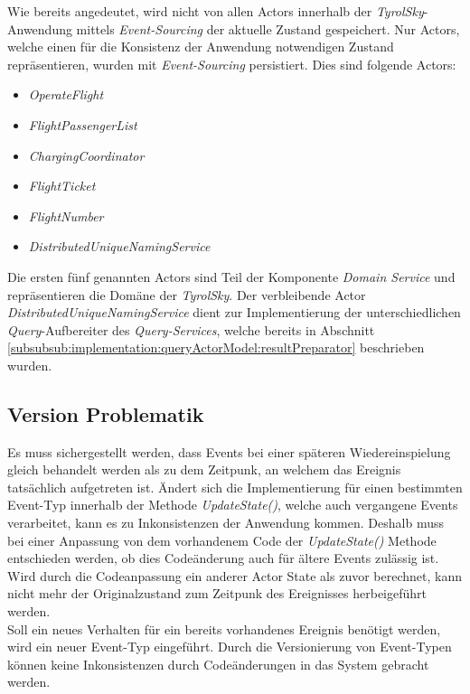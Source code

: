 Wie bereits angedeutet, wird nicht von allen Actors innerhalb der \textit{TyrolSky}-Anwendung mittels \textit{Event-Sourcing} der aktuelle Zustand gespeichert. Nur Actors, welche einen für die Konsistenz der Anwendung notwendigen Zustand repräsentieren, wurden mit \textit{Event-Sourcing} persistiert. Dies sind folgende Actors: 
\begin{itemize}
  \item{\textit{OperateFlight}}
  \item{\textit{FlightPassengerList}}
  \item{\textit{ChargingCoordinator}}
  \item{\textit{FlightTicket}}
  \item{\textit{FlightNumber}}
  \item{\textit{DistributedUniqueNamingService}}
\end{itemize}
Die ersten fünf genannten Actors sind Teil der Komponente \textit{Domain Service} und repräsentieren die Domäne der \textit{TyrolSky}. Der verbleibende Actor \textit{DistributedUniqueNamingService} dient zur Implementierung der unterschiedlichen \textit{Query}-Aufbereiter des \textit{Query-Services}, welche bereits in Abschnitt \ref{subsubsub:implementation:queryActorModel:resultPreparator} beschrieben wurden.

\subsection{Version Problematik}
Es muss sichergestellt werden, dass Events bei einer späteren Wiedereinspielung gleich behandelt werden als zu dem Zeitpunk, an welchem das Ereignis tatsächlich aufgetreten ist. Ändert sich die Implementierung für einen bestimmten Event-Typ innerhalb der Methode \textit{UpdateState()}, welche auch vergangene Events verarbeitet, kann es zu Inkonsistenzen der Anwendung kommen. Deshalb muss bei einer Anpassung von dem vorhandenem Code der \textit{UpdateState()} Methode entschieden werden, ob dies Codeänderung auch für ältere Events zulässig ist. Wird durch die Codeanpassung ein anderer Actor State als zuvor berechnet, kann nicht mehr der Originalzustand zum Zeitpunk des Ereignisses herbeigeführt werden. \\
Soll ein neues Verhalten für ein bereits vorhandenes Ereignis benötigt werden, wird ein neuer Event-Typ eingeführt. Durch die Versionierung von Event-Typen können keine Inkonsistenzen durch Codeänderungen in das System gebracht werden. 
